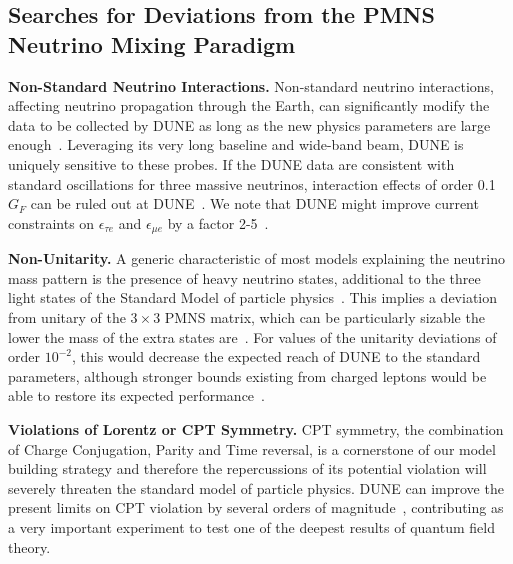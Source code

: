 

\subsection{Searches for Deviations from the PMNS Neutrino Mixing Paradigm}
{\bf Non-Standard Neutrino Interactions.}
Non-standard neutrino interactions, affecting neutrino propagation through the Earth, can significantly modify the data to be collected by DUNE as long as the new physics parameters are large enough~\cite{Masud:2015xva}. Leveraging its very long baseline and wide-band beam, DUNE is uniquely sensitive to  these probes. If the DUNE data are consistent with standard oscillations for three massive neutrinos, interaction effects of order 0.1 $G_F$ can be ruled out at DUNE~\cite{deGouvea:2015ndi,Coloma:2015kiu}. We note that DUNE might improve current constraints on $\epsilon_{\tau e}$ and $\epsilon_{\mu e}$ by a factor 2-5~\cite{Farzan:2017xzy}.

{\bf Non-Unitarity.} 
A generic characteristic of most models explaining the neutrino mass
pattern is the presence of heavy neutrino states, additional to the
three light states of the Standard Model of particle
physics~\cite{Minkowski:1977sc,Mohapatra:1979ia,Yanagida:1979as,GellMann:1980vs}. This implies a deviation from unitary of the $3\times3$ PMNS matrix, which can be particularly sizable the lower the mass of the extra states are~\cite{Mohapatra:1986bd,Akhmedov:1995vm,Akhmedov:1995ip,Malinsky:2005bi}.
For values of the unitarity deviations of order $10^{-2}$, this would decrease the expected reach of DUNE to the standard parameters, although stronger bounds existing from charged leptons would be able to restore its expected performance~\cite{Blennow:2016jkn,Escrihuela:2016ube}.

{\bf Violations of Lorentz or CPT Symmetry.}
CPT symmetry, the combination of Charge Conjugation, Parity and Time reversal, is a cornerstone of our model building strategy and therefore the repercussions of its potential violation will severely threaten the standard model of particle physics. DUNE can improve the present limits on CPT violation by several orders of magnitude~\cite{Streater:1989vi,Barenboim:2002tz,Barenboim:2017ewj}, contributing
as a very important experiment to test one of the deepest results of quantum field theory.

